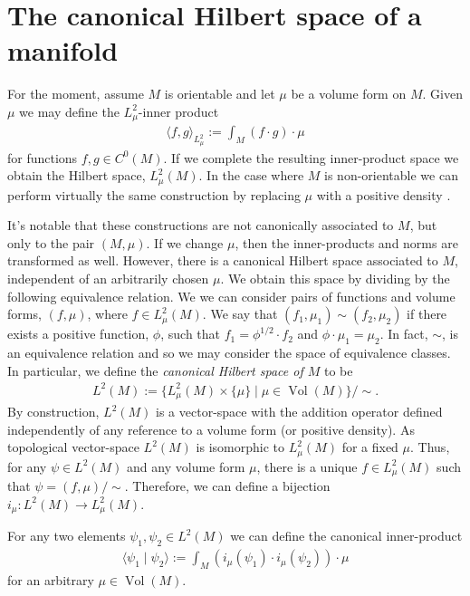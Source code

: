 \documentclass[final,leqno]{siamart}
\begin{document}

\section{The canonical Hilbert space of a manifold}
\label{sec:L2}
For the moment, assume $M$ is orientable and let $\mu$ be a volume form on $M$.
Given $\mu$ we may define the $L^2_{\mu}$-inner product
\begin{align*}
	\langle f, g \rangle_{L^2_\mu} := \int_M ( f \cdot g) \cdot \mu
\end{align*}
for functions $f,g \in C^0(M)$.
If we complete the resulting inner-product space we obtain the Hilbert space, $L^2_\mu(M)$.
In the case where $M$ is non-orientable we can perform virtually the same construction by replacing $\mu$ with a positive density \cite{Lee2006}.

It's notable that these constructions are not canonically associated to $M$, but only to the pair $(M, \mu)$.
If we change $\mu$, then the inner-products and norms are transformed as well.
However, there is a canonical Hilbert space associated to $M$, independent of an arbitrarily chosen $\mu$.
We obtain this space by dividing by the following equivalence relation.
We we can consider pairs of functions and volume forms, $(f,\mu)$, where $f \in L^2_\mu(M)$.
We say that $(f_1, \mu_1) \sim (f_2,\mu_2)$ if there exists a positive function, $\phi$, such that $f_1 = \phi^{1/2} \cdot f_2$ and $\phi \cdot \mu_1 = \mu_2$.
In fact, $\sim$, is an equivalence relation and so we may consider the space of equivalence classes.
In particular, we define the \emph{canonical Hilbert space of $M$} to be
\begin{align*}
	L^2(M) := \{ L^2_\mu(M) \times \{ \mu \} \mid \mu \in \operatorname{Vol}(M) \} / \sim.
\end{align*}
By construction, $L^2(M)$ is a vector-space with the addition operator defined independently of any reference to a volume form (or positive density).
As topological vector-space $L^2(M)$ is isomorphic to $L^2_\mu(M)$ for a fixed $\mu$.
Thus, for any $\psi \in L^2(M)$ and any volume form $\mu$, there is a unique $f \in L^2_\mu(M)$ such that $\psi = (f,\mu) / \sim$.
Therefore, we can define a bijection $i_{\mu} : L^2(M) \to L^2_\mu(M)$.

For any two elements $\psi_1, \psi_2 \in L^2(M)$ we can define the canonical inner-product
\begin{align}
	\langle \psi_1 \mid \psi_2 \rangle := \int_M (i_{\mu}( \psi_1) \cdot i_{\mu}( \psi_2) ) \cdot \mu \label{eq:canonical inner product}
\end{align}
for an arbitrary $\mu \in \operatorname{Vol}(M)$.
\end{document}
